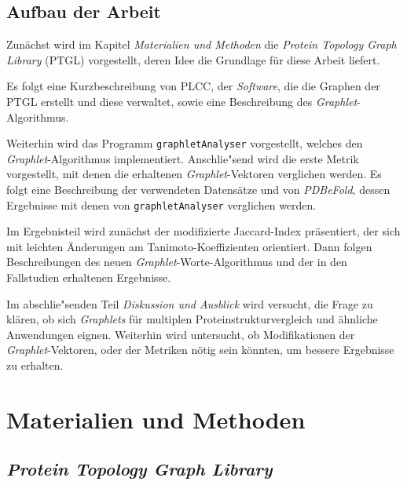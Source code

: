 \documentclass{report}
\begin{document}
\section{Aufbau der Arbeit}

Zun\"achst wird im Kapitel \emph{Materialien und Methoden} die \textit{Protein Topology Graph Library} (PTGL) \cite{ptgl1} vorgestellt, deren Idee die Grundlage f\"ur diese Arbeit liefert. 
 
Es folgt eine Kurzbeschreibung von PLCC, der \textit{Software}, die die Graphen der PTGL erstellt und diese verwaltet, sowie eine Beschreibung des \textit{Graphlet}-Algorithmus.

Weiterhin wird das Programm \texttt{graphletAnalyser} vorgestellt, welches den \textit{Graphlet}-Algorithmus implementiert.
Anschlie"send wird die erste Metrik vorgestellt, mit denen die erhaltenen \textit{Graphlet}-Vektoren verglichen werden. Es folgt eine Beschreibung der verwendeten Datens\"atze und von \textit{PDBeFold}, dessen Ergebnisse mit denen von \texttt{graphletAnalyser} verglichen werden.

Im Ergebnisteil wird zun\"achst der modifizierte Jaccard-Index pr\"asentiert, der sich mit leichten \"Anderungen am Tanimoto-Koeffizienten orientiert. Dann folgen Beschreibungen des neuen \textit{Graphlet}-Worte-Algorithmus und der in den Fallstudien erhaltenen Ergebnisse.

Im abschlie"senden Teil \emph{Diskussion und Ausblick} wird versucht, die Frage zu kl\"aren, ob sich \textit{Graphlets} f\"ur multiplen Proteinstrukturvergleich und \"ahnliche Anwendungen eignen. Weiterhin wird untersucht, ob Modifikationen der \textit{Graphlet}-Vektoren, oder der Metriken n\"otig sein k\"onnten, um bessere Ergebnisse zu erhalten. 



\chapter{Materialien und Methoden}






\section{\textit{Protein Topology Graph Library}}
\end{document}
